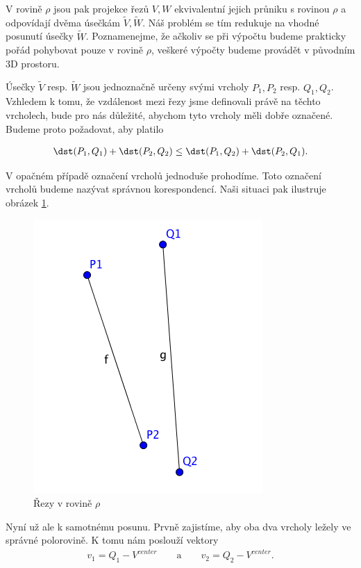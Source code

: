 V rovině $ \rho $ jsou pak projekce řezů $ V, W $ ekvivalentní jejich průniku
s rovinou $ \rho $ a odpovídají dvěma úsečkám $ \widetilde{V}, \widetilde{W} $.
Náš problém se tím redukuje na vhodné posunutí úsečky $ \widetilde{W} $.
Poznamenejme, že ačkoliv se při výpočtu budeme prakticky pořád pohybovat pouze
v rovině $ \rho $, veškeré výpočty budeme provádět v původním 3D prostoru.

Úsečky $ \widetilde{V} $ resp.
$ \widetilde{W} $ jsou jednoznačně určeny svými vrcholy $ P_1, P_2 $ resp. $ Q_1, Q_2 $.
Vzhledem k tomu, že vzdálenost mezi řezy jsme definovali právě na těchto vrcholech,
bude pro nás důležité, abychom tyto vrcholy měli dobře označené. Budeme proto
požadovat, aby platilo

\begin{align*}
    \dst(P_1, Q_1) + \dst(P_2, Q_2) \leq \dst(P_1, Q_2) + \dst(P_2, Q_1).
\end{align*}

V opačném případě označení vrcholů jednoduše prohodíme. Toto označení vrcholů
budeme nazývat správnou korespondencí. Naši situaci pak ilustruje obrázek
\ref{fig:segments_basic}.

\begin{figure}[ht]
    \centering
    \includegraphics{img/segments_basic.png}
    \caption{Řezy v rovině $ \rho $}
  \centering
  \label{fig:segments_basic}
\end{figure}

Nyní už ale k samotnému posunu. Prvně zajistíme, aby oba dva vrcholy ležely ve
správné polorovině. K tomu nám poslouží vektory
\begin{align*}
    v_1 = Q_1 - V^{center} \qquad\text{a}\qquad v_2 = Q_2 - V^{center}.
\end{align*}

